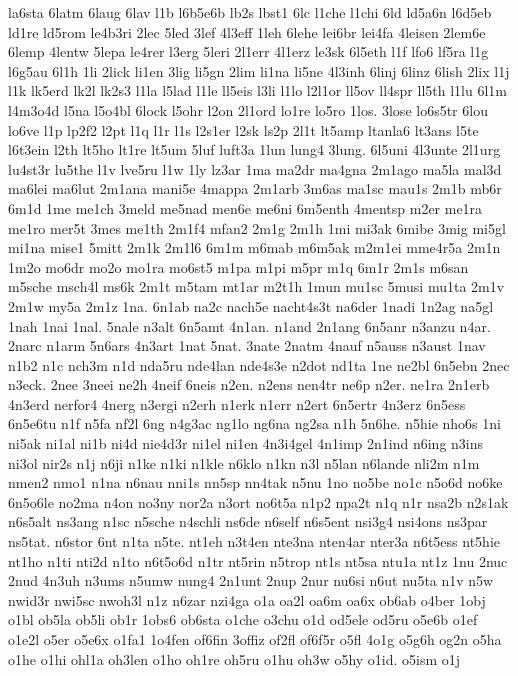 {la6sta
6latm
6laug
6lav
l1b
l6b5e6b
lb2s
lbst1
6lc
l1che
l1chi
6ld
ld5a6n
l6d5eb
ld1re
ld5rom
le4b3ri
2lec
5led
3lef
4l3eff
1leh
6lehe
lei6br
lei4fa
4leisen
2lem6e
6lemp
4lentw
5lepa
le4rer
l3erg
5leri
2l1err
4l1erz
le3sk
6l5eth
l1f
lfo6
lf5ra
l1g
l6g5au
6l1h
1li
2lick
li1en
3lig
li5gn
2lim
li1na
li5ne
4l3inh
6linj
6linz
6lish
2lix
l1j
l1k
lk5erd
lk2l
lk2s3
l1la
l5lad
l1le
ll5eis
l3li
l1lo
l2l1or
ll5ov
ll4spr
ll5th
l1lu
6l1m
l4m3o4d
l5na
l5o4bl
6lock
l5ohr
l2on
2l1ord
lo1re
lo5ro
1los.
3lose
lo6s5tr
6lou
lo6ve
l1p
lp2f2
l2pt
l1q
l1r
l1s
l2s1er
l2sk
ls2p
2l1t
lt5amp
ltanla6
lt3ans
l5te
l6t3ein
l2th
lt5ho
lt1re
lt5um
5luf
luft3a
1lun
lung4
3lung.
6l5uni
4l3unte
2l1urg
lu4st3r
lu5the
l1v
lve5ru
l1w
1ly
lz3ar
1ma
ma2dr
ma4gna
2m1ago
ma5la
mal3d
ma6lei
ma6lut
2m1ana
mani5e
4mappa
2m1arb
3m6as
ma1sc
mau1s
2m1b
mb6r
6m1d
1me
me1ch
3meld
me5nad
men6e
me6ni
6m5enth
4mentsp
m2er
me1ra
me1ro
mer5t
3mes
me1th
2m1f4
mfan2
2m1g
2m1h
1mi
mi3ak
6mibe
3mig
mi5gl
mi1na
mise1
5mitt
2m1k
2m1l6
6m1m
m6mab
m6m5ak
m2m1ei
mme4r5a
2m1n
1m2o
mo6dr
mo2o
mo1ra
mo6st5
m1pa
m1pi
m5pr
m1q
6m1r
2m1s
m6san
m5sche
msch4l
ms6k
2m1t
m5tam
mt1ar
m2t1h
1mun
mu1sc
5musi
mu1ta
2m1v
2m1w
my5a
2m1z
1na.
6n1ab
na2c
nach5e
nacht4s3t
na6der
1nadi
1n2ag
na5gl
1nah
1nai
1nal.
5nale
n3alt
6n5amt
4n1an.
n1and
2n1ang
6n5anr
n3anzu
n4ar.
2narc
n1arm
5n6ars
4n3art
1nat
5nat.
3nate
2natm
4nauf
n5auss
n3aust
1nav
n1b2
n1c
nch3m
n1d
nda5ru
nde4lan
nde4s3e
n2dot
nd1ta
1ne
ne2bl
6n5ebn
2nec
n3eck.
2nee
3neei
ne2h
4neif
6neis
n2en.
n2ens
nen4tr
ne6p
n2er.
ne1ra
2n1erb
4n3erd
nerfor4
4nerg
n3ergi
n2erh
n1erk
n1err
n2ert
6n5ertr
4n3erz
6n5ess
6n5e6tu
n1f
n5fa
nf2l
6ng
n4g3ac
ng1lo
ng6na
ng2sa
n1h
5n6he.
n5hie
nho6s
1ni
ni5ak
ni1al
ni1b
ni4d
nie4d3r
ni1el
ni1en
4n3i4gel
4n1imp
2n1ind
n6ing
n3ins
ni3ol
nir2s
n1j
n6ji
n1ke
n1ki
n1kle
n6klo
n1kn
n3l
n5lan
n6lande
nli2m
n1m
nmen2
nmo1
n1na
n6nau
nni1s
nn5sp
nn4tak
n5nu
1no
no5be
no1c
n5o6d
no6ke
6n5o6le
no2ma
n4on
no3ny
nor2a
n3ort
no6t5a
n1p2
npa2t
n1q
n1r
nsa2b
n2s1ak
n6s5alt
ns3ang
n1sc
n5sche
n4schli
ns6de
n6self
n6s5ent
nsi3g4
nsi4ons
ns3par
ns5tat.
n6stor
6nt
n1ta
n5te.
nt1eh
n3t4en
nte3na
nten4ar
nter3a
n6t5ess
nt5hie
nt1ho
n1ti
nti2d
n1to
n6t5o6d
n1tr
nt5rin
n5trop
nt1s
nt5sa
ntu1a
nt1z
1nu
2nuc
2nud
4n3uh
n3ums
n5umw
nung4
2n1unt
2nup
2nur
nu6si
n6ut
nu5ta
n1v
n5w
nwid3r
nwi5sc
nwoh3l
n1z
n6zar
nzi4ga
o1a
oa2l
oa6m
oa6x
ob6ab
o4ber
1obj
o1bl
ob5la
ob5li
ob1r
1obs6
ob6sta
o1che
o3chu
o1d
od5ele
od5ru
o5e6b
o1ef
o1e2l
o5er
o5e6x
o1fa1
1o4fen
of6fin
3offiz
of2fl
of6f5r
o5fl
4o1g
o5g6h
og2n
o5ha
o1he
o1hi
ohl1a
oh3len
o1ho
oh1re
oh5ru
o1hu
oh3w
o5hy
o1id.
o5ism
o1j
}
